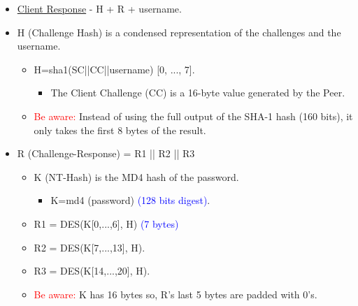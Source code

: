 \begin{tcolorbox}[colback=yellow!10!white, colframe=yellow!70!black, title=Peer \textrightarrow Authenticator] 
    
    \begin{itemize}
        \item \underline{Client Response} - H + R + username.
        \item H (Challenge Hash) is a condensed representation of the challenges and the username.
        \begin{itemize}
            \item H=sha1(SC||CC||username) [0, ..., 7].
        \begin{itemize}
            \item The Client Challenge (CC) is a 16-byte value generated by the Peer.
        \end{itemize}
        \item \textcolor{red}{Be aware: }Instead of using the full output of the SHA-1 hash (160 bits), it only takes the first 8 bytes of the result. 
        \end{itemize}
        
        \item R (Challenge-Response) = R1 || R2 || R3
        \begin{itemize}
            \item K (NT-Hash) is the MD4 hash of the password.
        \begin{itemize}
            \item K=md4 (password) \textcolor{Blue}{(128 bits digest)}.
        \end{itemize}
            \item R1 = DES(K[0,...,6], H) \textcolor{Blue}{(7 bytes)}
            \item R2 = DES(K[7,...,13], H).
            \item R3 = DES(K[14,...,20], H).
            \item \textcolor{red}{Be aware: } K has 16 bytes so, R's last 5 bytes are padded with 0's.
        \end{itemize}
    \end{itemize}
    
\end{tcolorbox}

